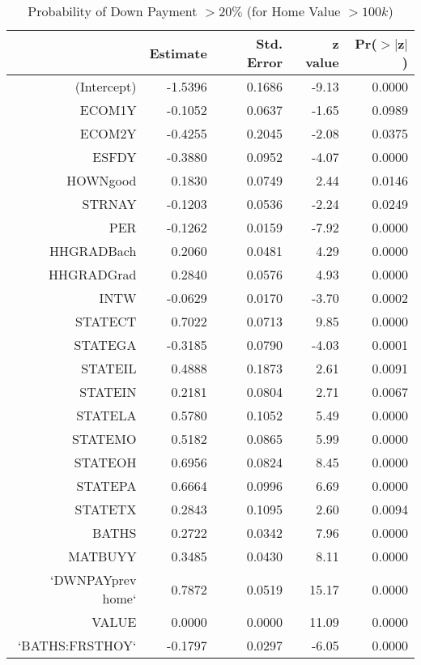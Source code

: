 \begin{table}[ht]
\centering
\begin{tabular}{rrrrr}
  \hline
 & Estimate & Std. Error & z value & Pr($>$$|$z$|$) \\ 
  \hline
(Intercept) & -1.5396 & 0.1686 & -9.13 & 0.0000 \\ 
  ECOM1Y & -0.1052 & 0.0637 & -1.65 & 0.0989 \\ 
  ECOM2Y & -0.4255 & 0.2045 & -2.08 & 0.0375 \\ 
  ESFDY & -0.3880 & 0.0952 & -4.07 & 0.0000 \\ 
  HOWNgood & 0.1830 & 0.0749 & 2.44 & 0.0146 \\ 
  STRNAY & -0.1203 & 0.0536 & -2.24 & 0.0249 \\ 
  PER & -0.1262 & 0.0159 & -7.92 & 0.0000 \\ 
  HHGRADBach & 0.2060 & 0.0481 & 4.29 & 0.0000 \\ 
  HHGRADGrad & 0.2840 & 0.0576 & 4.93 & 0.0000 \\ 
  INTW & -0.0629 & 0.0170 & -3.70 & 0.0002 \\ 
  STATECT & 0.7022 & 0.0713 & 9.85 & 0.0000 \\ 
  STATEGA & -0.3185 & 0.0790 & -4.03 & 0.0001 \\ 
  STATEIL & 0.4888 & 0.1873 & 2.61 & 0.0091 \\ 
  STATEIN & 0.2181 & 0.0804 & 2.71 & 0.0067 \\ 
  STATELA & 0.5780 & 0.1052 & 5.49 & 0.0000 \\ 
  STATEMO & 0.5182 & 0.0865 & 5.99 & 0.0000 \\ 
  STATEOH & 0.6956 & 0.0824 & 8.45 & 0.0000 \\ 
  STATEPA & 0.6664 & 0.0996 & 6.69 & 0.0000 \\ 
  STATETX & 0.2843 & 0.1095 & 2.60 & 0.0094 \\ 
  BATHS & 0.2722 & 0.0342 & 7.96 & 0.0000 \\ 
  MATBUYY & 0.3485 & 0.0430 & 8.11 & 0.0000 \\ 
  `DWNPAYprev home` & 0.7872 & 0.0519 & 15.17 & 0.0000 \\ 
  VALUE & 0.0000 & 0.0000 & 11.09 & 0.0000 \\ 
  `BATHS:FRSTHOY` & -0.1797 & 0.0297 & -6.05 & 0.0000 \\ 
   \hline
\end{tabular}
\caption{Probability of Down Payment $>20\%$ (for Home Value $>100k$)} 
\label{tab:reg6_fdr}
\end{table}
